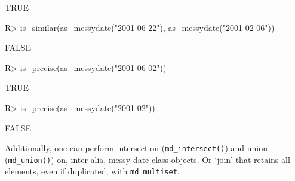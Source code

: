 \documentclass[
]{jss}
\begin{document}
\begin{CodeChunk}
\begin{CodeOutput}
[1] TRUE
\end{CodeOutput}
\begin{CodeInput}
R> is_similar(as_messydate("2001-06-22"), as_messydate("2001-02-06"))
\end{CodeInput}
\begin{CodeOutput}
[1] FALSE
\end{CodeOutput}
\begin{CodeInput}
R> is_precise(as_messydate("2001-06-02"))
\end{CodeInput}
\begin{CodeOutput}
[1] TRUE
\end{CodeOutput}
\begin{CodeInput}
R> is_precise(as_messydate("2001-02"))
\end{CodeInput}
\begin{CodeOutput}
[1] FALSE
\end{CodeOutput}
\end{CodeChunk}

Additionally, one can perform intersection (\texttt{md\_intersect()})
and union (\texttt{md\_union()}) on, inter alia, messy date class
objects. Or `join' that retains all elements, even if duplicated, with
\texttt{md\_multiset}.
\end{document}
